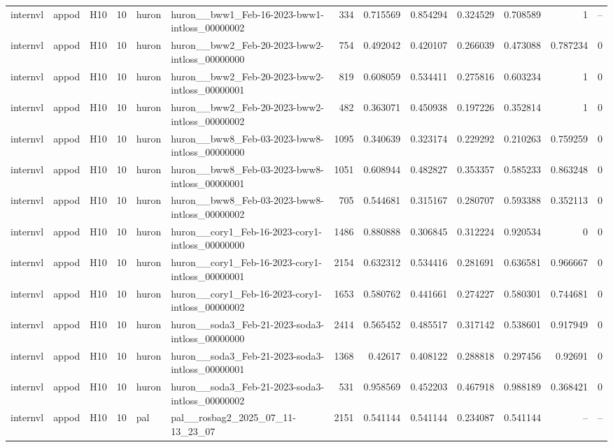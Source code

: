 \begin{longtable}{lllrllrrrrrrr}
internvl & appod & H10 & 10 & huron & huron\_\_bww1\_Feb-16-2023-bww1-intloss\_00000002 & 334 & 0.715569 & 0.854294 & 0.324529 & 0.708589 & 1 & -- \\
internvl & appod & H10 & 10 & huron & huron\_\_bww2\_Feb-20-2023-bww2-intloss\_00000000 & 754 & 0.492042 & 0.420107 & 0.266039 & 0.473088 & 0.787234 & 0 \\
internvl & appod & H10 & 10 & huron & huron\_\_bww2\_Feb-20-2023-bww2-intloss\_00000001 & 819 & 0.608059 & 0.534411 & 0.275816 & 0.603234 & 1 & 0 \\
internvl & appod & H10 & 10 & huron & huron\_\_bww2\_Feb-20-2023-bww2-intloss\_00000002 & 482 & 0.363071 & 0.450938 & 0.197226 & 0.352814 & 1 & 0 \\
internvl & appod & H10 & 10 & huron & huron\_\_bww8\_Feb-03-2023-bww8-intloss\_00000000 & 1095 & 0.340639 & 0.323174 & 0.229292 & 0.210263 & 0.759259 & 0 \\
internvl & appod & H10 & 10 & huron & huron\_\_bww8\_Feb-03-2023-bww8-intloss\_00000001 & 1051 & 0.608944 & 0.482827 & 0.353357 & 0.585233 & 0.863248 & 0 \\
internvl & appod & H10 & 10 & huron & huron\_\_bww8\_Feb-03-2023-bww8-intloss\_00000002 & 705 & 0.544681 & 0.315167 & 0.280707 & 0.593388 & 0.352113 & 0 \\
internvl & appod & H10 & 10 & huron & huron\_\_cory1\_Feb-16-2023-cory1-intloss\_00000000 & 1486 & 0.880888 & 0.306845 & 0.312224 & 0.920534 & 0 & 0 \\
internvl & appod & H10 & 10 & huron & huron\_\_cory1\_Feb-16-2023-cory1-intloss\_00000001 & 2154 & 0.632312 & 0.534416 & 0.281691 & 0.636581 & 0.966667 & 0 \\
internvl & appod & H10 & 10 & huron & huron\_\_cory1\_Feb-16-2023-cory1-intloss\_00000002 & 1653 & 0.580762 & 0.441661 & 0.274227 & 0.580301 & 0.744681 & 0 \\
internvl & appod & H10 & 10 & huron & huron\_\_soda3\_Feb-21-2023-soda3-intloss\_00000000 & 2414 & 0.565452 & 0.485517 & 0.317142 & 0.538601 & 0.917949 & 0 \\
internvl & appod & H10 & 10 & huron & huron\_\_soda3\_Feb-21-2023-soda3-intloss\_00000001 & 1368 & 0.42617 & 0.408122 & 0.288818 & 0.297456 & 0.92691 & 0 \\
internvl & appod & H10 & 10 & huron & huron\_\_soda3\_Feb-21-2023-soda3-intloss\_00000002 & 531 & 0.958569 & 0.452203 & 0.467918 & 0.988189 & 0.368421 & 0 \\
internvl & appod & H10 & 10 & pal & pal\_\_rosbag2\_2025\_07\_11-13\_23\_07 & 2151 & 0.541144 & 0.541144 & 0.234087 & 0.541144 & -- & -- \\

\end{longtable}
